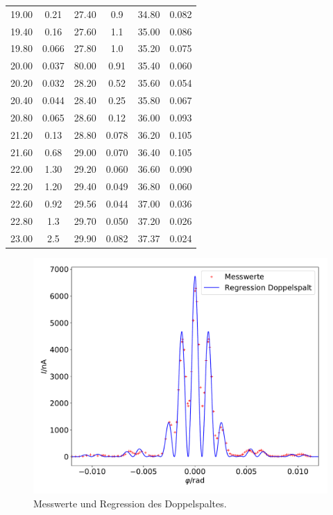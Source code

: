 \begin{table}
\begin{tabular}{c c || c c || c c}
    19.00 & 0.21 & 27.40 & 0.9 & 34.80 & 0.082 \\
    19.40 & 0.16 & 27.60 & 1.1 & 35.00 & 0.086 \\
    19.80 & 0.066 & 27.80 & 1.0 & 35.20  & 0.075 \\
    20.00 & 0.037 & 80.00 & 0.91 & 35.40 & 0.060 \\
    20.20 & 0.032 & 28.20 & 0.52 & 35.60 & 0.054 \\
    20.40 & 0.044 & 28.40 & 0.25 & 35.80 & 0.067 \\
    20.80 & 0.065 & 28.60 & 0.12 & 36.00 & 0.093 \\
    21.20 & 0.13 & 28.80 & 0.078 & 36.20 & 0.105 \\
    21.60 & 0.68 & 29.00 & 0.070 & 36.40 & 0.105 \\
    22.00 & 1.30 & 29.20 & 0.060 & 36.60 & 0.090 \\
    22.20 & 1.20 & 29.40 & 0.049 & 36.80 & 0.060 \\
    22.60 & 0.92 & 29.56 & 0.044 & 37.00 & 0.036 \\
    22.80 & 1.3 & 29.70 & 0.050 & 37.20 & 0.026 \\
    23.00 & 2.5 & 29.90 & 0.082 & 37.37 & 0.024 \\
    \bottomrule
  \end{tabular}

\end{table}

\begin{figure}
  \centering
  \includegraphics[scale = 0.5]{doppel.pdf}
  \caption{Messwerte und Regression des Doppelspaltes.}
  \label{Abb:3}
\end{figure}

